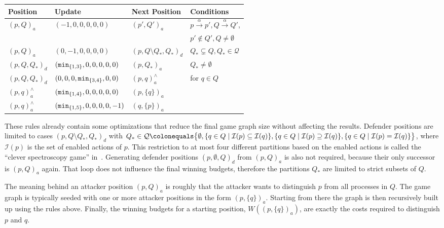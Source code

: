 \begin{table}[h!]
\centering

\begin{tabular}{l l l l}
    \toprule
    Position &Update &Next Position &Conditions \\
    \midrule
    ${(p, Q)}_a$ &$(-1, 0, 0, 0, 0, 0)$ &${(p', Q')}_a$
        &$p \xrightarrow{\alpha} p', Q \xrightarrow{\alpha} Q'$, \\
      &&&$p' \notin Q', Q \neq \emptyset$ \\
    ${(p, Q)}_a$ &$(0, -1, 0, 0, 0, 0)$ &${(p, Q \setminus Q_*, Q_*)}_d$
        &$Q_* \subsetneq Q, Q_* \in \mathcal{Q}$ \\
    ${(p, Q, Q_*)}_d$ &$(\mathtt{min}_{\{1, 3\}}, 0, 0, 0, 0, 0)$ &${(p, Q_*)}_a$
        &$Q_* \neq \emptyset$ \\
    ${(p, Q, Q_*)}_d$ &$(0, 0, 0, \mathtt{min}_{\{3, 4\}}, 0, 0)$
        &${(p, q)}_a^{\scriptscriptstyle\land}$
        &for $q \in Q$ \\
    ${(p, q)}_a^{\scriptscriptstyle\land}$
        &$(\mathtt{min}_{\{1, 4\}}, 0, 0, 0, 0, 0)$
        &${(p, \{q\})}_a$ \\
    ${(p, q)}_a^{\scriptscriptstyle\land}$
        &$(\mathtt{min}_{\{1, 5\}}, 0, 0, 0, 0, -1)$
        &${(q, \{p\})}_a$ \\
    \bottomrule
\end{tabular}
\end{table}

These rules already contain some optimizations that reduce the final game graph
size without affecting the results.
Defender positions are limited to cases
${(p, Q \setminus Q_*, Q_*)}_d$ with
$Q_* \in \mathcal{Q} \colonequals
\big\{\emptyset,
    \{q \in Q \mid \mathcal{I}(p) \subseteq \mathcal{I}(q)\},
    \{q \in Q \mid {\mathcal{I}(p) \supseteq \mathcal{I}(q)}\},
    \{q \in Q \mid \mathcal{I}(p) =         \mathcal{I}(q)\}
\big\}$,
where $\mathcal{I}(p)$ is the set of enabled actions of $p$.
This restriction to at most four different partitions
based on the enabled actions is called the
\enquote{clever spectroscopy game} in~\cite{bisping2023process}.
Generating defender positions ${(p, \emptyset, Q)}_d$ from ${(p, Q)}_a$
is also not required,
because their only successor is ${(p, Q)}_a$ again.
That loop does not influence the final winning budgets,
therefore the partitions $Q_*$ are limited to strict subsets of $Q$.

The meaning behind an attacker position ${(p, Q)}_a$ is roughly
that the attacker wants to distinguish $p$ from all processes in $Q$.
The game graph is typically seeded with one or more attacker positions
in the form ${(p, \{q\})}_a$.
Starting from there the graph is then recursively built up
using the rules above.
Finally, the winning budgets for a starting position,
$W({(p, \{q\})}_a)$,
are exactly the costs required to distinguish $p$ and $q$.

